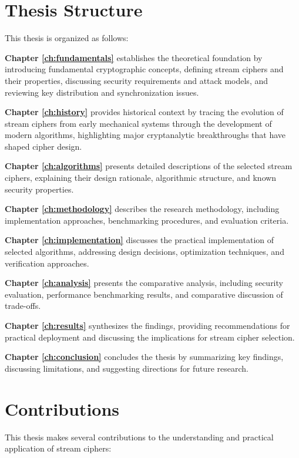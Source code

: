 \documentclass[12pt,a4paper,oneside]{report}
\begin{document}
\section{Thesis Structure}
\label{sec:structure}

This thesis is organized as follows:

\textbf{Chapter \ref{ch:fundamentals}} establishes the theoretical foundation by introducing fundamental cryptographic concepts, defining stream ciphers and their properties, discussing security requirements and attack models, and reviewing key distribution and synchronization issues.

\textbf{Chapter \ref{ch:history}} provides historical context by tracing the evolution of stream ciphers from early mechanical systems through the development of modern algorithms, highlighting major cryptanalytic breakthroughs that have shaped cipher design.

\textbf{Chapter \ref{ch:algorithms}} presents detailed descriptions of the selected stream ciphers, explaining their design rationale, algorithmic structure, and known security properties.

\textbf{Chapter \ref{ch:methodology}} describes the research methodology, including implementation approaches, benchmarking procedures, and evaluation criteria.

\textbf{Chapter \ref{ch:implementation}} discusses the practical implementation of selected algorithms, addressing design decisions, optimization techniques, and verification approaches.

\textbf{Chapter \ref{ch:analysis}} presents the comparative analysis, including security evaluation, performance benchmarking results, and comparative discussion of trade-offs.

\textbf{Chapter \ref{ch:results}} synthesizes the findings, providing recommendations for practical deployment and discussing the implications for stream cipher selection.

\textbf{Chapter \ref{ch:conclusion}} concludes the thesis by summarizing key findings, discussing limitations, and suggesting directions for future research.

\section{Contributions}
\label{sec:contributions}

This thesis makes several contributions to the understanding and practical application of stream ciphers:
\end{document}
